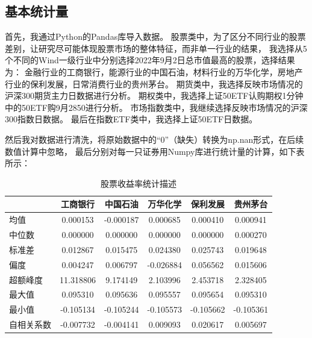 \documentclass[a4paper,12pt]{article}
\begin{document}
\subsection{基本统计量}

首先，我通过Python的Pandas库导入数据。
股票类中，为了区分不同行业的股票差别，让研究尽可能体现股票市场的整体特征，而非单一行业的结果，
我选择从5个不同的Wind一级行业中分别选择2022年9月2日总市值最高的股票，选择结果为：
金融行业的工商银行，能源行业的中国石油，材料行业的万华化学，房地产行业的保利发展，日常消费行业的贵州茅台。
期货类中，我选择反映市场情况的沪深300期货主力日数据进行分析。
期权类中，我选择上证50ETF认购期权1分钟中的50ETF购9月2850进行分析。
市场指数类中，我继续选择反映市场情况的沪深300指数日数据。
最后在指数ETF类中，我选择上证50ETF日数据。

然后我对数据进行清洗，将原始数据中的“0”（缺失）转换为np.nan形式，在后续数值计算中忽略，
最后分别对每一只证券用Numpy库进行统计量的计算，如下表所示：

\begin{table}[H]
\centering
\caption{股票收益率统计描述}
\begin{tabularx}{\textwidth}{lCCCCC}
\toprule
 & 工商银行 & 中国石油 & 万华化学 & 保利发展 & 贵州茅台 \\
\midrule
均值 & 0.000153 & -0.000187 & 0.000685 & 0.000410 & 0.000941 \\
中位数 & 0.000000 & 0.000000 & 0.000000 & 0.000000 & 0.000270 \\
标准差 & 0.012867 & 0.015475 & 0.024380 & 0.025743 & 0.019648 \\
偏度 & 0.004247 & 0.006797 & -0.026884 & 0.056562 & 0.015606 \\
超额峰度 & 11.318806 & 9.174149 & 2.103996 & 2.453718 & 2.328405 \\
最大值 & 0.095310 & 0.095636 & 0.095557 & 0.095654 & 0.095310 \\
最小值 & -0.105134 & -0.105244 & -0.105573 & -0.105662 & -0.105361 \\
自相关系数 & -0.007732 & -0.004141 & 0.009093 & 0.020617 & 0.005697 \\
\bottomrule
\end{tabularx}
\end{table}
\end{document}
